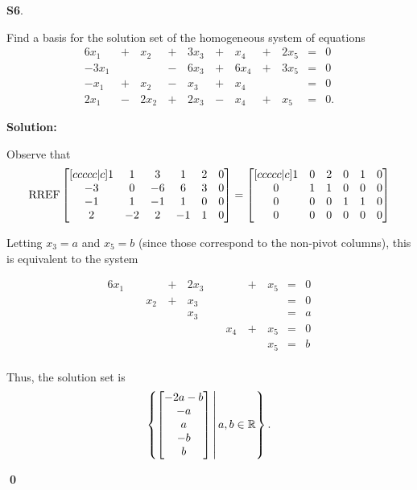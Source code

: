 \documentclass{article}
\newenvironment{problem}[1]
{
	\begin{flushleft}
	\textbf{#1}.
	\ignorespaces
}
{
	\end{flushleft}
}
\newenvironment{solution}
{
	\ignorespaces
	\textbf{Solution:}
}
{
	\ignorespacesafterend
	\begin{flushright}
	{\bfseries \qed}
	\end{flushright}
}
\begin{document}
\begin{problem}{S6}
Find a basis for the solution set of the homogeneous system of equations
\begin{alignat*}{6}
x_1 &\,+\,& x_2 &\,+\,& 3x_3 &\,+\,& x_4 &\,+\,& 2x_5 &=& 0 \\
-3x_1 &\,\,&  &\,-\,& 6x_3 &\,+\,&6 x_4 &\,+\,& 3x_5 &=& 0 \\
-x_1 &\,+\,& x_2 &\,-\,& x_3 &\,+\,& x_4 &\,\,&  &=& 0 \\
2x_1 &\,-\,& 2x_2 &\,+\,& 2x_3 &\,-\,& x_4 &\,+\,& x_5 &=& 0 .
\end{alignat*}
\end{problem}
\begin{solution}
Observe that
\[ \operatorname{RREF}
		\begin{bmatrix}[ccccc|c]
		1 & 1 & 3 & 1 & 2 & 0\\
		-3 & 0 & -6 & 6 & 3 & 0\\
		-1 & 1 & -1 & 1 & 0 & 0\\
		2 & -2 & 2 & -1 & 1& 0
		\end{bmatrix} =
		\begin{bmatrix}[ccccc|c]
		1 & 0 & 2 & 0 & 1 &0\\
		0 & 1 & 1 & 0 & 0 &0\\
		0 & 0 & 0 & 1 & 1 &0\\
		0 & 0 & 0 & 0 & 0&0
		\end{bmatrix}
\]

Letting \(x_3=a\) and \(x_5=b\)
(since those correspond to the non-pivot columns),
this is equivalent to the system

\begin{alignat*}{6}
x_1 &\,\,&  &\,+\,& 2x_3 &\,\,&  &\,+\,& x_5 &=& 0 \\
 &\,\,& x_2 &\,+\,& x_3 &\,\,& &\,\,&  &=& 0 \\
 &\,\,&  &\,\,& x_3 &\,\,&  &\,\,&  &=& a \\
 &\,\,&  &\,\,&  &\,\,& x_4 &\,+\,& x_5 &=& 0 \\
 &\,\,&  &\,\,&  &\,\,&  &\,\,& x_5 &=& b \\
\end{alignat*}

Thus, the solution set is
\[ \left\{\begin{bmatrix} -2a-b \\ -a \\ a \\ -b \\ b \end{bmatrix}\,\middle|\,a,b \in \mathbb{R}\right\} .\]


\end{solution}
\end{document}

